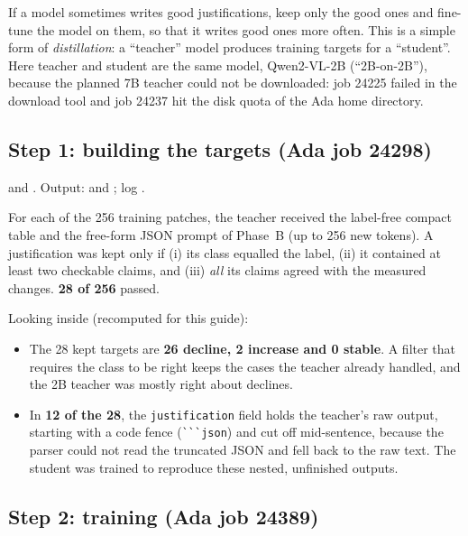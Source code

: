 If a model sometimes writes good justifications, keep only the good ones and fine-tune the model on them, so that it writes good ones more often. This is a simple form of \emph{distillation}: a ``teacher'' model produces training targets for a ``student''. Here teacher and student are the same model, Qwen2-VL-2B (``2B-on-2B''), because the planned 7B teacher could not be downloaded: job 24225 failed in the download tool and job 24237 hit the disk quota of the Ada home directory.

\subsection{Step 1: building the targets (Ada job 24298)}

\begin{wherecode}
 and . Output:  and ; log .
\end{wherecode}

For each of the 256 training patches, the teacher received the label-free compact table and the free-form JSON prompt of Phase~B (up to 256 new tokens). A justification was kept only if (i) its class equalled the label, (ii) it contained at least two checkable claims, and (iii) \emph{all} its claims agreed with the measured changes. \textbf{28 of 256} passed.

\begin{newinfo}
Looking inside  (recomputed for this guide):
\begin{itemize}
  \item The 28 kept targets are \textbf{26 decline, 2 increase and 0 stable}. A filter that requires the class to be right keeps the cases the teacher already handled, and the 2B teacher was mostly right about declines.
  \item In \textbf{12 of the 28}, the \texttt{justification} field holds the teacher's raw output, starting with a code fence (\verb|```json|) and cut off mid-sentence, because the parser could not read the truncated JSON and fell back to the raw text. The student was trained to reproduce these nested, unfinished outputs.
\end{itemize}
\end{newinfo}

\subsection{Step 2: training (Ada job 24389)}

